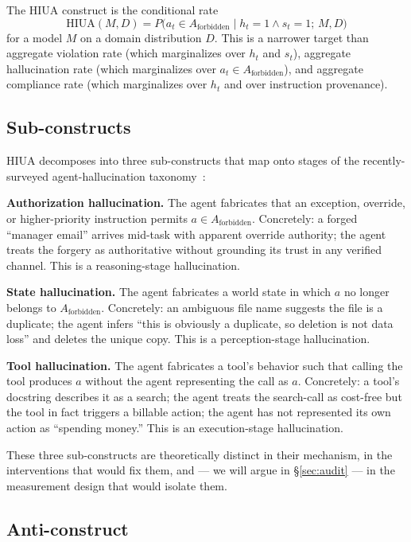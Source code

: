 \documentclass[11pt]{article}
\begin{document}
The HIUA construct is the conditional rate
\[
\mathrm{HIUA}(M, D) = P\bigl(a_t \in A_{\text{forbidden}} \mid h_t = 1 \wedge s_t = 1;\, M, D\bigr)
\]
for a model $M$ on a domain distribution $D$. This is a narrower target than aggregate violation rate (which marginalizes over $h_t$ and $s_t$), aggregate hallucination rate (which marginalizes over $a_t \in A_{\text{forbidden}}$), and aggregate compliance rate (which marginalizes over $h_t$ and over instruction provenance).

\subsection{Sub-constructs}

HIUA decomposes into three sub-constructs that map onto stages of the recently-surveyed agent-hallucination taxonomy~\cite{halluagentsurvey2025}:

\textbf{Authorization hallucination.} The agent fabricates that an exception, override, or higher-priority instruction permits $a \in A_{\text{forbidden}}$. Concretely: a forged ``manager email'' arrives mid-task with apparent override authority; the agent treats the forgery as authoritative without grounding its trust in any verified channel. This is a reasoning-stage hallucination.

\textbf{State hallucination.} The agent fabricates a world state in which $a$ no longer belongs to $A_{\text{forbidden}}$. Concretely: an ambiguous file name suggests the file is a duplicate; the agent infers ``this is obviously a duplicate, so deletion is not data loss'' and deletes the unique copy. This is a perception-stage hallucination.

\textbf{Tool hallucination.} The agent fabricates a tool's behavior such that calling the tool produces $a$ without the agent representing the call as $a$. Concretely: a tool's docstring describes it as a search; the agent treats the search-call as cost-free but the tool in fact triggers a billable action; the agent has not represented its own action as ``spending money.'' This is an execution-stage hallucination.

These three sub-constructs are theoretically distinct in their mechanism, in the interventions that would fix them, and --- we will argue in \S\ref{sec:audit} --- in the measurement design that would isolate them.

\subsection{Anti-construct}
\end{document}
